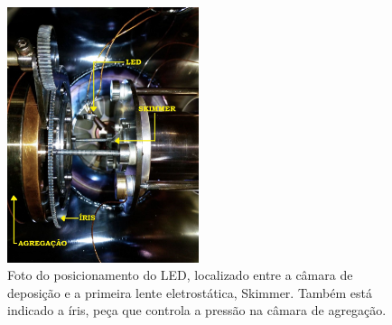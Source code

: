 \begin{figure}
  \centering
  \includegraphics[width=0.5\textwidth]{images/foca/led_montagem}
  \caption{Foto do posicionamento do LED, localizado entre a câmara de deposição e a primeira lente eletrostática, Skimmer. Também está indicado a íris, peça que controla a pressão na câmara de agregação.}
  \label{fig:led_montagem}
\end{figure}

